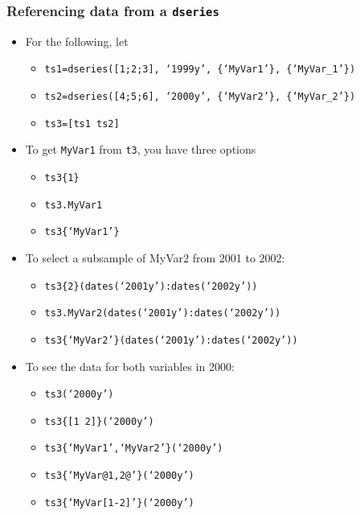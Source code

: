 \documentclass[10pt]{beamer}
\begin{document}
\begin{frame}[fragile,t]
  \frametitle{Referencing data from a \texttt{dseries}}
  \begin{itemize}
  \item For the following, let
    \begin{itemize}
    \item \texttt{ts1=dseries([1;2;3], `1999y', \{`MyVar1'\}, \{`MyVar\_1'\})}
    \item \texttt{ts2=dseries([4;5;6], `2000y', \{`MyVar2'\}, \{`MyVar\_2'\})}
    \item \texttt{ts3=[ts1 ts2]}
    \end{itemize}
  \item To get \texttt{MyVar1} from \texttt{t3}, you have three options
    \begin{itemize}
      \item \texttt{ts3\{1\}}
      \item \texttt{ts3.MyVar1}
      \item \texttt{ts3\{`MyVar1'\}}
    \end{itemize}
  \item To select a subsample of MyVar2 from 2001 to 2002:
    \begin{itemize}
      \item \texttt{ts3\{2\}(dates(`2001y'):dates(`2002y'))}
      \item \texttt{ts3.MyVar2(dates(`2001y'):dates(`2002y'))}
      \item \texttt{ts3\{`MyVar2'\}(dates(`2001y'):dates(`2002y'))}
    \end{itemize}
  \item To see the data for both variables in 2000:
    \begin{itemize}
      \item \texttt{ts3(`2000y')}
      \item \texttt{ts3\{[1 2]\}(`2000y')}
      \item \texttt{ts3\{`MyVar1',`MyVar2'\}(`2000y')}
      \item \texttt{ts3\{`MyVar@1,2@'\}(`2000y')}
      \item \texttt{ts3\{`MyVar[1-2]'\}(`2000y')}
    \end{itemize}
  \end{itemize}
\end{frame}
\end{document}
